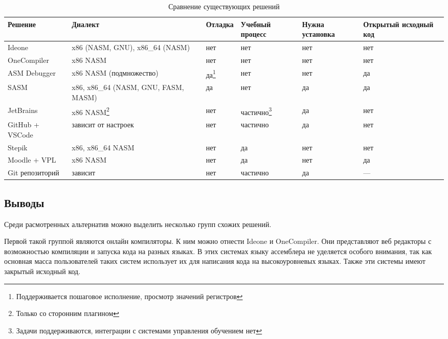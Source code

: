 \documentclass[a4paper,article,14pt]{extarticle}
\begin{document}
\begin{center}
\small
    \begin{longtable}{|p{4cm}|p{2cm}|p{2cm}|p{2cm}|p{2cm}|p{2cm}|}
    \caption{Сравнение существующих решений}\label{table:alternatives} \\
    \hline
    \textbf{Решение} & \textbf{Диалект} & \textbf{Отладка} & \textbf{Учебный процесс} & \textbf{Нужна установка} & \textbf{Открытый исходный код} \\
    \hline
    Ideone & x86 (NASM, GNU), x86\_64 (NASM) & нет & нет & нет & нет \\ \hline
    OneCompiler & x86 NASM & нет & нет & нет & нет \\ \hline
    ASM Debugger & x86 NASM (подмножество) & да\footnote{Поддерживается пошаговое исполнение, просмотр значений регистров} & нет & нет & да \\ \hline
    SASM & x86, x86\_64 (NASM, GNU, FASM, MASM) & да & нет & да & да \\ \hline
    JetBrains & x86 NASM\footnote{Только со сторонним плагином} & нет & частично\footnote{Задачи поддерживаются, интеграции с системами управления обучением нет} & да & нет \\ \hline
    GitHub + VSCode & зависит от настроек & нет & частично & да & нет \\ \hline
    Stepik & x86, x86\_64 NASM & нет & да & нет & нет \\ \hline
    Moodle + VPL & x86 NASM & нет & да & нет & да \\ \hline
    Git репозиторий & зависит & нет & частично & да & --- \\ \hline
    \end{longtable}
\end{center}

\subsection{Выводы}

Среди расмотренных альтернатив можно выделить несколько групп схожих решений.

Первой такой группой являются онлайн компиляторы. К ним можно отнести Ideone и OneCompiler. Они представляют веб редакторы с возможностью компиляции и запуска кода на разных языках. В этих системах языку ассемблера не уделяется особого внимания, так как основная масса пользователей таких систем использует их для написания кода на высокоуровневых языках. Также эти системы имеют закрытый исходный код.
\end{document}
